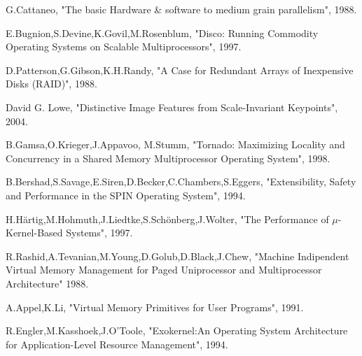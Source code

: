 {\RaggedRight
\begin{thebibliography}{9}
\addtolength{\leftmargin}{0.2in}
\setlength{\itemindent}{0.2in}

   G.Cattaneo, "The basic Hardware \& software to medium grain parallelism", 1988.
  
   E.Bugnion,S.Devine,K.Govil,M.Rosenblum, "Disco: Running Commodity Operating Systems on Scalable Multiprocessors", 1997.
  
   D.Patterson,G.Gibson,K.H.Randy, "A Case for Redundant Arrays of Inexpensive Disks (RAID)", 1988.
  
   David G. Lowe, "Distinctive Image Features from Scale-Invariant Keypoints", 2004.
  
   B.Gamsa,O.Krieger,J.Appavoo, M.Stumm, "Tornado: Maximizing Locality and Concurrency in a Shared Memory Multiprocessor Operating System", 1998.
  
   B.Bershad,S.Savage,E.Siren,D.Becker,C.Chambers,S.Eggers, "Extensibility, Safety and Performance in the SPIN Operating System", 1994.
  
  H.H\"{a}rtig,M.Hohmuth,J.Liedtke,S.Sch\"{o}nberg,J.Wolter, "The Performance of $\mu$-Kernel-Based Systems", 1997.
  
   R.Rashid,A.Tevanian,M.Young,D.Golub,D.Black,J.Chew, "Machine Indipendent Virtual Memory Management for Paged Uniprocessor and Multiprocessor Architecture" 1988.
  
   A.Appel,K.Li, "Virtual Memory Primitives for User Programs", 1991.
  
   R.Engler,M.Kasshoek,J.O'Toole, "Exokernel:An Operating System Architecture for Application-Level Resource Management", 1994.
\end{thebibliography}
}
